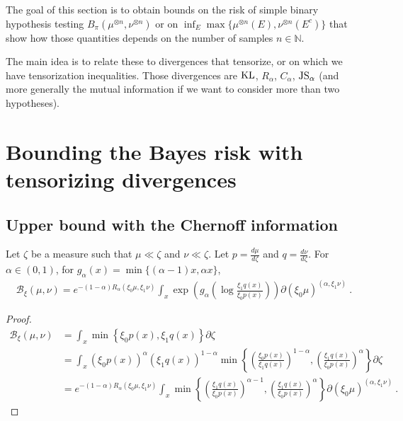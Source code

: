
The goal of this section is to obtain bounds on the risk of simple binary hypothesis testing $B_\pi(\mu^{\otimes n}, \nu^{\otimes n})$ or on $\inf_{E} \max\{\mu^{\otimes n}(E), \nu^{\otimes n}(E^c)\}$ that show how those quantities depends on the number of samples $n \in \mathbb{N}$.

The main idea is to relate these to divergences that tensorize, or on which we have tensorization inequalities. Those divergences are $\operatorname{KL}$, $R_\alpha$, $C_\alpha$, $\operatorname{JS}_\alpha$ (and more generally the mutual information if we want to consider more than two hypotheses).



\section{Bounding the Bayes risk with tensorizing divergences}

\subsection{Upper bound with the Chernoff information}

\begin{lemma}
  \label{lem:bayesBinaryRisk_eq_exp_renyi_mul_integral}
  Let $\zeta$ be a measure such that $\mu \ll \zeta$ and $\nu \ll \zeta$. Let $p = \frac{d \mu}{d\zeta}$ and $q = \frac{d \nu}{d\zeta}$.
  For $\alpha \in (0,1)$, for $g_\alpha(x) = \min\{(\alpha-1)x, \alpha x\}$,
  \begin{align*}
  \mathcal B_\xi(\mu, \nu)
  = e^{-(1 - \alpha) R_\alpha(\xi_0\mu, \xi_1\nu)} \int_x \exp \left(g_\alpha\left( \log \frac{\xi_1 q(x)}{\xi_0 p(x)} \right)\right) \partial(\xi_0\mu)^{(\alpha, \xi_1\nu)}
  \: .
  \end{align*}
\end{lemma}

\begin{proof}%
{}
\begin{align*}
\mathcal B_\xi(\mu, \nu)
&= \int_x \min \left\{\xi_0 p(x), \xi_1 q(x)\right\} \partial\zeta
\\
&= \int_x (\xi_0 p(x))^\alpha (\xi_1 q(x))^{1-\alpha} \min \left\{ \left(\frac{\xi_0p(x)}{\xi_1q(x)}\right)^{1 - \alpha}, \left(\frac{\xi_1q(x)}{\xi_0p(x)}\right)^\alpha\right\} \partial\zeta
\\
&= e^{-(1 - \alpha) R_\alpha(\xi_0\mu, \xi_1\nu)} \int_x \min \left\{ \left(\frac{\xi_1q(x)}{\xi_0p(x)}\right)^{\alpha - 1}, \left(\frac{\xi_1q(x)}{\xi_0p(x)}\right)^\alpha\right\} \partial(\xi_0\mu)^{(\alpha, \xi_1\nu)}
\: .
\end{align*}
\end{proof}


